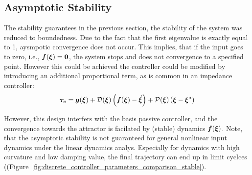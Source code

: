 

\subsection{Asymptotic Stability}
The stability guarantees in the previous section, the stability of the system was reduced to boundedness. 
Due to the fact that the first eigenvalue is exactly equal to 1, aysmpotic convergence does not occur. 
This implies, that if the input goes to zero, i.e., $\boldsymbol{f}(\boldsymbol{\xi}) = \boldsymbol{0}$, the system stops and does not convergence to a specified point. 
However this could be achieved the controller could be modified by introducing an additional proportional term, as is common in an impedance controller:
\begin{equation}
	\vecs{\tau_c} = \vect g (\vecs\xi) 
	+ \matd{D}(\vecs\xi) \left(\vecs f(\vecs\xi) - \vecs{\dot\xi} \right) 
	+ \matd{P}(\vecs \xi) \left(\vecs \xi - \vecs \xi^a \right)
\label{eq:control_command}
\end{equation}

However, this design interfers with the basis passive controller, and the convergence towards the attractor is facilated by (stable) dynamics $\boldsymbol{f}(\boldsymbol{\xi})$. 
Note, that the asymptotic stability is not guaranteed for general nonlinear input dynamics under the linear dynamics analys. Especially for dynamics with high curvature and low damping value, the final trajectory can end up in limit cyclces ((Figure~\ref{fig:discrete_controller_parameters_comparison_stable}).

